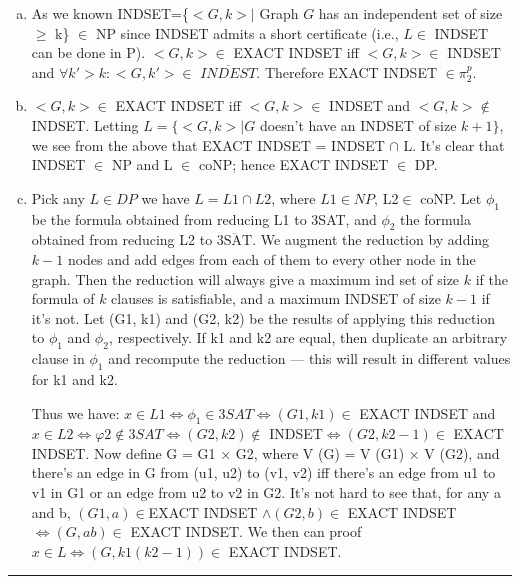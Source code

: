 \documentclass[twoside]{article}
\newenvironment{solution}{{\bf Solution:}}{\hfill\rule{2mm}{2mm}}
\begin{document}
\begin{solution}
\begin{enumerate}[(a)]
	\item As we known INDSET=\{$<G,k>|$ Graph $G$ has an independent set of size $\ge$ k\} $\in$ NP since INDSET admits a short certificate (i.e., $L\in$ INDSET can be done in P).
	$<G,k>\in$ EXACT INDSET iff $<G,k>\in$ INDSET and $\forall k' > k: <G,k'> \in $ $\overline{INDEST}$. Therefore EXACT INDSET $\in \pi_2^p$.

	\item 	$<G,k>\in$ EXACT INDSET iff $<G,k>\in$ INDSET and $<G,k>\notin$ INDSET.
	Letting $L = \{<G, k>|G$ doesn’t have an INDSET of size $k + 1\}$, we see from
	the above that EXACT INDSET = INDSET $\cap$ L. It’s clear that INDSET $\in$ NP and
	L $\in$ coNP; hence EXACT INDSET $\in$ DP.
	
	\item 
Pick any $L \in DP$ we have $L = L1 \cap L2$, where $L1 \in NP$, L2$\in$ coNP. Let
	$\phi_1$ be the formula obtained from reducing L1 to 3SAT, and $\phi_2$ the formula
	obtained from reducing L2 to $\overline{\text{3SAT}}$. 
	We augment the 	reduction by adding $k − 1$ nodes and add edges from each of them to every
	other node in the graph. Then the reduction will always give a maximum
	ind set of size $k$ if the formula of $k$ clauses is satisfiable, and a maximum INDSET of size $k − 1$ if it’s not. Let (G1, k1) and (G2, k2) be the results of applying this reduction to $\phi_1$ and $\phi_2$, respectively. If k1 and k2 are equal, then duplicate an arbitrary clause in $\phi_1$ and recompute the reduction — this 	will result in different values for k1 and k2.

Thus we have: $x \in L1 \Leftrightarrow \phi_1 \in 3SAT \Leftrightarrow (G1, k1) \in$ EXACT INDSET and $x \in L2 \Leftrightarrow φ2 \notin 3SAT \Leftrightarrow (G2, k2) \notin$  INDSET$\Leftrightarrow (G2, k2 − 1) \in$ EXACT INDSET.
Now define G = G1 × G2, where V (G) = V (G1) × V (G2), and there’s an edge in G from (u1, u2) to (v1, v2) iff there’s an edge from u1 to v1 in G1 or an edge from u2 to v2 in G2. It’s not hard to see that, for any a and b, $(G1, a) \in $EXACT INDSET $\wedge (G2, b)\in$ EXACT INDSET $\Leftrightarrow (G, ab) \in$ EXACT INDSET.
We then can proof $x\in L \Leftrightarrow (G,k1(k2-1))\in$ EXACT INDSET.
\end{enumerate}
\end{solution}
\end{document}
